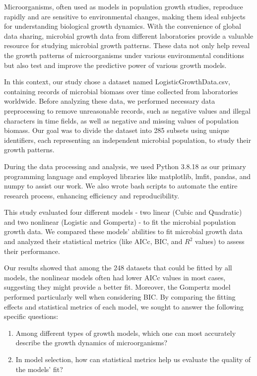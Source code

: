 \documentclass[11pt]{article}
\begin{document}
\begin{linenumbers}
Microorganisms, often used as models in population growth studies\citep{ismatova2022research}, reproduce rapidly and are sensitive to environmental changes, making them ideal subjects for understanding biological growth dynamics. With the convenience of global data sharing, microbial growth data from different laboratories provide a valuable resource for studying microbial growth patterns. These data not only help reveal the growth patterns of microorganisms under various environmental conditions but also test and improve the predictive power of various growth models.

In this context, our study chose a dataset named LogisticGrowthData.csv, containing records of microbial biomass over time collected from laboratories worldwide. Before analyzing these data, we performed necessary data preprocessing to remove unreasonable records, such as negative values and illegal characters in time fields, as well as negative and missing values of population biomass. Our goal was to divide the dataset into 285 subsets using unique identifiers, each representing an independent microbial population, to study their growth patterns.

During the data processing and analysis, we used Python 3.8.18 as our primary programming language and employed libraries like matplotlib, lmfit, pandas, and numpy to assist our work. We also wrote bash scripts to automate the entire research process, enhancing efficiency and reproducibility.

This study evaluated four different models - two linear (Cubic and Quadratic) and two nonlinear (Logistic\citep{peleg_modeling_1997}\citep{fujikawa_new_2004} and Gompertz\citep{chatterjee_antibacterial_2015}\citep{buchanan_when_1997}) - to fit the microbial population growth data. We compared these 
models' abilities to fit microbial growth data and analyzed their statistical metrics (like AICc, BIC, and $R^2$ values) to assess their performance.

Our results showed that among the 248 datasets that could be fitted by all models, the nonlinear models often had lower AICc values in most cases, suggesting they might provide a better fit. Moreover, the Gompertz model performed particularly well when considering BIC. By comparing the fitting effects and statistical metrics of each model, we sought to answer the following specific questions:
\begin{enumerate}
    \item Among different types of growth models, which one can most accurately describe the growth dynamics of microorganisms?
    \item In model selection, how can statistical metrics help us evaluate the quality of the models' fit?
\end{enumerate}


\end{linenumbers}
\end{document}
